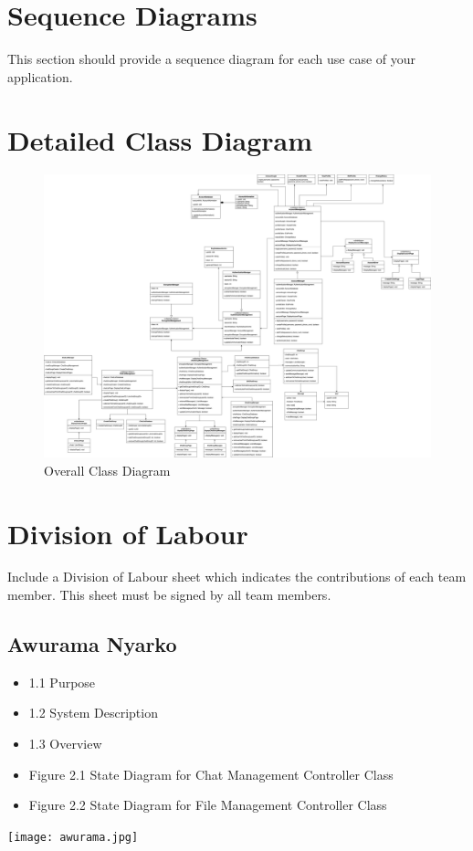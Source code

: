\documentclass[]{article}
\begin{document}
\section{Sequence Diagrams}
\label{sec:sequence_diagrams}
This section should provide a sequence diagram for each use case of your application.

\section{Detailed Class Diagram}
\label{sec:detailed_class_diagram}
\renewcommand{\thefigure}{4.\arabic{figure}}
\setcounter{figure}{0}
\begin{figure}
    \centering
    \includegraphics[scale=0.18]{class-diagram.jpg}
    \caption{Overall Class Diagram}
    \label{fig:class-diagram}
\end{figure}

\appendix
\section{Division of Labour}
\label{sec:division_of_labour}
Include a Division of Labour sheet which indicates the contributions of each team member. This sheet must be signed by all team members.
\subsection{Awurama Nyarko}
\label{subsec:awurama_nyarko}
\begin{itemize}
	\item 1.1 Purpose
	\item 1.2 System Description
	\item 1.3 Overview
 	\item Figure 2.1 State Diagram for Chat Management Controller Class
  	\item Figure 2.2 State Diagram for File Management Controller Class
\end{itemize}
\texttt{[image: awurama.jpg]}
\end{document}
